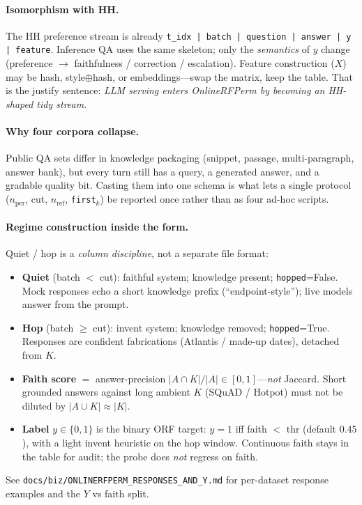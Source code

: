 \documentclass[11pt]{article}
\begin{document}
\paragraph{Isomorphism with HH.}
The HH preference stream is already
\texttt{t\_idx | batch | question | answer | y | feature}.
Inference QA uses the same skeleton; only the \emph{semantics} of $y$ change
(preference $\to$ faithfulness / correction / escalation). Feature construction
($X$) may be hash, style$\oplus$hash, or embeddings---swap the matrix, keep the
table. That is the justify sentence: \emph{LLM serving enters OnlineRFPerm by
becoming an HH-shaped tidy stream}.

\paragraph{Why four corpora collapse.}
Public QA sets differ in knowledge packaging (snippet, passage, multi-paragraph,
answer bank), but every turn still has a query, a generated answer, and a
gradable quality bit. Casting them into one schema is what lets a single
protocol ($n_{\mathrm{per}}$, cut, $n_{\mathrm{ref}}$, \texttt{first}$_k$) be
reported once rather than as four ad-hoc scripts.

\paragraph{Regime construction inside the form.}
Quiet / hop is a \emph{column discipline}, not a separate file format:
\begin{itemize}[leftmargin=1.2em]
\item \textbf{Quiet} (batch $<$ cut): faithful system; knowledge present;
\texttt{hopped}=False. Mock responses echo a short knowledge prefix
(``endpoint-style''); live models answer from the prompt.
\item \textbf{Hop} (batch $\ge$ cut): invent system; knowledge removed;
\texttt{hopped}=True. Responses are confident fabrications
(Atlantis / made-up dates), detached from $K$.
\item \textbf{Faith score} $=$ answer-precision
$|A\cap K|/|A|\in[0,1]$---\emph{not} Jaccard.
Short grounded answers against long ambient $K$ (SQuAD / Hotpot) must not be
diluted by $|A\cup K|\approx|K|$.
\item \textbf{Label} $y\in\{0,1\}$ is the binary ORF target:
$y=1$ iff faith $<$ thr (default $0.45$), with a light invent heuristic on the
hop window. Continuous faith stays in the table for audit; the probe does
\emph{not} regress on faith.
\end{itemize}
See \texttt{docs/biz/ONLINERFPERM\_RESPONSES\_AND\_Y.md} for per-dataset
response examples and the $Y$ vs faith split.
\end{document}
